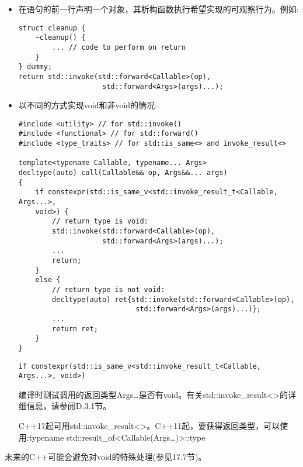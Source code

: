 \begin{itemize}
\item
在语句的前一行声明一个对象，其析构函数执行希望实现的可观察行为。例如:

\begin{lstlisting}[style=styleCXX]
struct cleanup {
	~cleanup() {
		... // code to perform on return
	}
} dummy;
return std::invoke(std::forward<Callable>(op),
					std::forward<Args>(args)...);
\end{lstlisting}

\item
以不同的方式实现void和非void的情况:

\begin{lstlisting}[style=styleCXX]
#include <utility> // for std::invoke()
#include <functional> // for std::forward()
#include <type_traits> // for std::is_same<> and invoke_result<>

template<typename Callable, typename... Args>
decltype(auto) call(Callable&& op, Args&&... args)
{
	if constexpr(std::is_same_v<std::invoke_result_t<Callable, Args...>,
	void>) {
		// return type is void:
		std::invoke(std::forward<Callable>(op),
					std::forward<Args>(args)...);
		...
		return;
	}
	else {
		// return type is not void:
		decltype(auto) ret{std::invoke(std::forward<Callable>(op),
							std::forward<Args>(args)...)};
		...
		return ret;
	}
}
\end{lstlisting}

\begin{lstlisting}[style=styleCXX]
if constexpr(std::is_same_v<std::invoke_result_t<Callable, Args...>, void>)
\end{lstlisting}

编译时测试调用的返回类型Args…是否有void。有关std::invoke\_result<>的详细信息，请参阅D.3.1节。

\begin{tcolorbox}[colback=webgreen!5!white,colframe=webgreen!75!black]
\hspace*{0.75cm}C++17起可用std::invoke\_result<>。C++11起，要获得返回类型，可以使用:typename std::result\_of<Callable(Args…)>::type
\end{tcolorbox}

\end{itemize}

未来的C++可能会避免对void的特殊处理(参见17.7节)。












